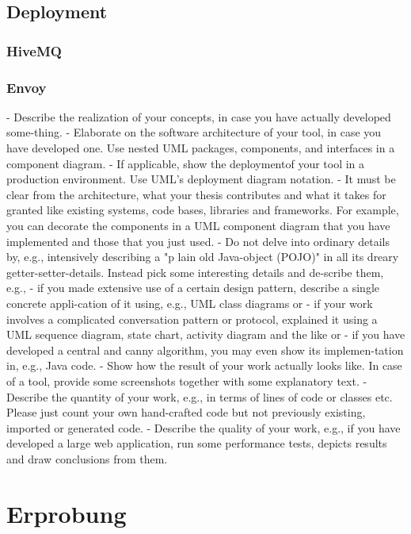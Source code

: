 \subsection{Deployment}
\subsubsection{HiveMQ}
\subsubsection{Envoy}

- Describe the realization of your concepts, in case you have actually developed some-thing.
- Elaborate on the software architecture of your tool, in case you have developed one. Use nested UML packages, components, and interfaces in a component diagram.
- If applicable, show the deploymentof your tool in a production environment. Use UML's deployment diagram notation.
- It must be clear from the architecture, what your thesis contributes and what it takes for granted like existing systems, code bases, libraries and frameworks. For example, you can decorate the components in a UML component diagram that you have implemented and those that you just used.
- Do not delve into ordinary details by, e.g., intensively describing a "p lain old Java-object (POJO)" in all its dreary getter-setter-details. Instead pick some interesting details and de-scribe them, e.g.,
  - if   you made extensive use of a certain design pattern, describe a single concrete appli-cation of it using, e.g., UML class diagrams or
  - if your work involves a complicated conversation pattern or protocol, explained it using a UML sequence diagram, state chart, activity diagram and the like or
  - if you have developed a central and canny algorithm, you may even show its implemen-tation in, e.g., Java code.
- Show how the result of your work actually looks like. In case of a tool, provide some screenshots together with some explanatory text.
- Describe the quantity of your work, e.g., in terms of lines of code or classes etc. Please just count your own hand-crafted code but not previously existing, imported or generated code.
- Describe the quality of your work, e.g., if you have developed a large web application, run some performance tests, depicts results and draw conclusions from them.

\section{Erprobung}

